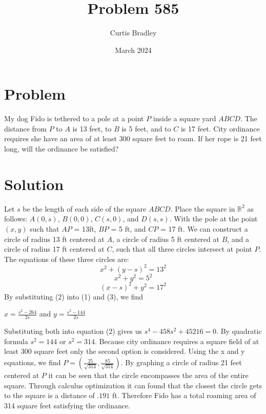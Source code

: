 \documentclass{article}
\title{Problem 585}
\author{Curtis Bradley}
\date{March 2024}
\begin{document}
\maketitle
\section{Problem}
My dog Fido is tethered to a pole at a point $P$ inside a square yard $ABCD$. The distance from $P$ to $A$ is 13 feet,
to $B$ is 5 feet, and to $C$ is 17 feet. City ordinance requires she have an area of at least 300 square feet to roam. If
her rope is 21 feet long, will the ordinance be satisfied?


\section{Solution} 
Let $s$ be the length of each side of the square $ABCD$. Place the square in $\mathbb{R}^2$ as follows: $A(0,s)$, $B(0,0)$, $C(s,0)$, and $D(s,s)$. With the pole at the point $(x,y)$ such that $AP$ = 13ft, $BP$ = 5 ft, and $CP$ = 17 ft. We can construct a circle of radius 13 ft centered at $A$, a circle of radius 5 ft centered at $B$, and a circle of radius 17 ft centered at $C$, such that all three circles intersect at point $P$. The equations of these three circles are:
\begin{equation}
    x^2 + (y-s)^2 = 13^2
\end{equation}
\begin{equation}
    x^2+y^2 = 5^2
\end{equation}
\begin{equation}
    (x-s)^2 + y^2 = 17 ^2
\end{equation}
By substituting (2) into (1) and (3), we find 

\begin{center}
    $x = \frac{s^2-264}{2s}$ and $y=\frac{s^2 - 144}{2s}$
\end{center}
Substituting both into equation (2) gives us
$s^4 - 458s^2+ 45216 = 0$. By quadratic formula $s^2 = 144$ or $s^2 = 314$. Because city ordinance requires a square field of at least 300 square feet only the second option is considered. Using the x and y equations, we find $P = (\frac{25}{\sqrt{314}},\frac{85}{\sqrt{314}})$. By graphing a circle of radius 21 feet centered at $P$ it can be seen that the circle encompasses the area of the entire square. Through calculus optimization it can found that the closest the circle gets to the square is a distance of $.191$ ft. Therefore Fido has a total roaming area of 314 square feet satisfying the ordinance.
\end{document}
